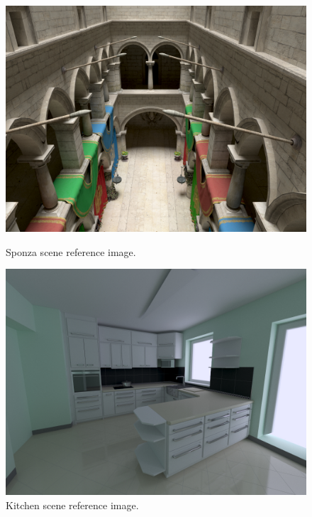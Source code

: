 \begin{figure}[ht]
\centering
\begin{minipage}[b]{0.3\linewidth}
\includegraphics[width=\linewidth]{img/sponza_ref.jpg}
\caption{\label{img:sponza_ref} Sponza scene reference image.}
\end{minipage}
\quad
\begin{minipage}[b]{0.3\linewidth}
\includegraphics[width=\linewidth]{img/kitchen_ref.jpg}
\caption{\label{img:kitchen_ref} Kitchen scene reference image.}
\end{minipage}
\quad
\begin{minipage}[b]{0.3\linewidth}

\end{minipage}
\end{figure}
